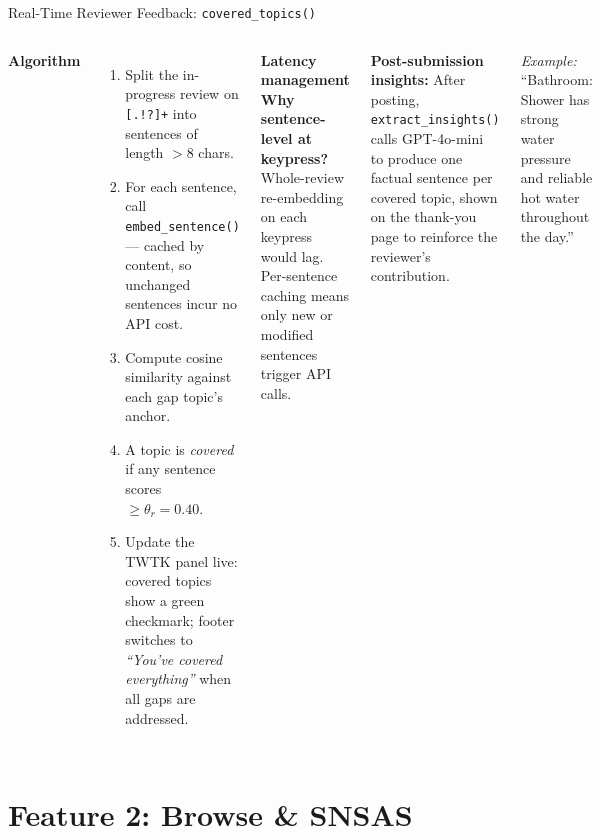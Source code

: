 \documentclass[aspectratio=169,10pt]{beamer}
\begin{document}
\begin{frame}{Real-Time Reviewer Feedback: \texttt{covered\_topics()}}
\begin{columns}[T]
\textbf{Algorithm}
\begin{enumerate}
  \item Split the in-progress review on \texttt{[.!?]+} into sentences
        of length $> 8$ chars.
  \item For each sentence, call \texttt{embed\_sentence()} — cached
        by content, so unchanged sentences incur no API cost.
  \item Compute cosine similarity against each gap topic's anchor.
  \item A topic is \textit{covered} if any sentence
        scores $\geq \theta_r = 0.40$.
  \item Update the TWTK panel live: covered topics show a green
        checkmark; footer switches to \textit{``You've covered
        everything''} when all gaps are addressed.
\end{enumerate}

\textbf{Latency management}\\[0.3em]
\small
\textbf{Why sentence-level at keypress?}
Whole-review re-embedding on each keypress would lag.
Per-sentence caching means only new or modified sentences
trigger API calls.

\medskip
\textbf{Post-submission insights:}
After posting, \texttt{extract\_insights()} calls GPT-4o-mini
to produce one factual sentence per covered topic, shown on the
thank-you page to reinforce the reviewer's contribution.

\medskip
\textit{Example:} ``Bathroom: Shower has strong water pressure
and reliable hot water throughout the day.''
\end{columns}
\end{frame}


\section{Feature 2: Browse \& SNSAS}
\end{document}
